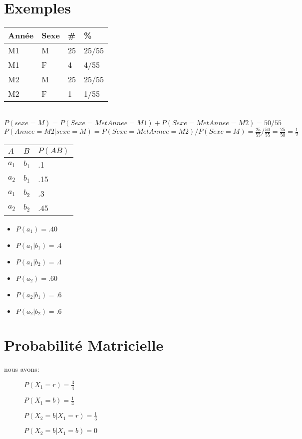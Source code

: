 \section{Exemples}
\begin{tabular}{ll|ll}
  \hline
  Année & Sexe & \# & \%  \\
  \hline
   M1 & M  & 25  &  25/55   \\
   M1 & F  & 4 &  4/55  \\
   M2 & M  & 25  & 25/55   \\
   M2 & F  & 1  &  1/55  \\
  \hline
\end{tabular}
\ \\
$P(sexe=M) = P(Sexe=M et Annee=M1) + P(Sexe=M et Annee=M2) = 50/55$\\
$P(Annee=M2 | sexe=M) = P(Sexe=M et Annee=M2) / P(Sexe=M) = \frac{25}{55} / \frac{50}{55} = \frac{25}{50} = \frac{1}{2}$
\\

\begin{multicols}{2}
[]
\begin{tabular}{ll|l}
  \hline
  $A$&$B$&$P(AB)$\\
  \hline
  $a_1$&$b_1$&.1\\
  $a_2$&$b_1$&.15\\
  $a_1$&$b_2$&.3\\
  $a_2$&$b_2$&.45\\
  \hline
\end{tabular}

\begin{itemize}
\item $P(a_1) = .40$
\item $P(a_1|b_1) = .4$
\item $P(a_1|b_2) = .4$
\item $P(a_2) = .60$
\item $P(a_2|b_1) = .6$
\item $P(a_2|b_2) = .6$
\end{itemize}

\end{multicols}

\pagebreak
\section{Probabilité Matricielle}

nous avons:
\begin{description}
\item[] $P(X_1=r) = \frac{3}{4}$
\item[] $P(X_1=b) = \frac{1}{4}$
\item[] $P(X_2=b | X_1=r) = \frac{1}{3}$
\item[] $P(X_2=b | X_1=b) = 0$
\end{description}

